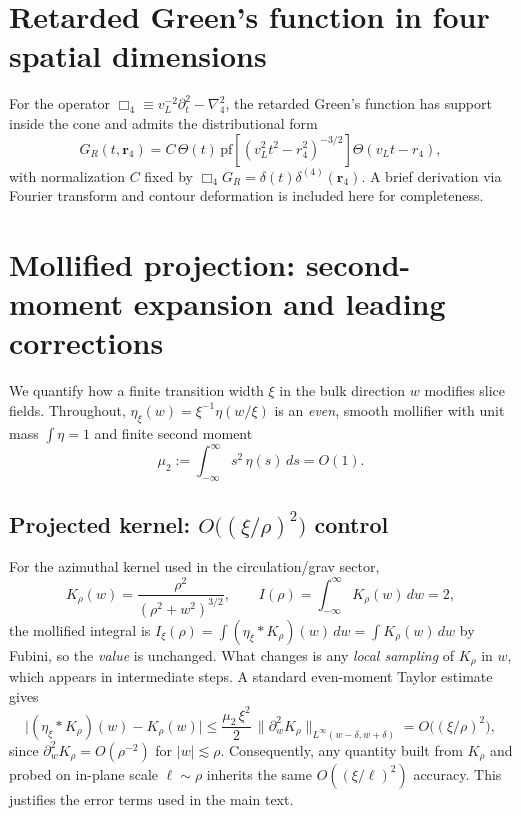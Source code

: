 \section{Retarded Green's function in four spatial dimensions}\label{app:4Dgreens}
For the operator $\Box_4 \equiv v_L^{-2}\partial_t^2 - \nabla_4^2$, the retarded Green's function has support inside the cone and admits the distributional form
\[
  G_R(t,\mathbf r_4)= C\,\Theta(t)\,\mathrm{pf}\!\left[(v_L^2 t^2 - r_4^2)^{-3/2}\right]\Theta(v_L t - r_4),
\]
with normalization $C$ fixed by $\Box_4 G_R = \delta(t)\delta^{(4)}(\mathbf r_4)$. A brief derivation via Fourier transform and contour deformation is included here for completeness.

\section{Mollified projection: second-moment expansion and leading corrections}
\label{app:mollified}

We quantify how a finite transition width $\xi$ in the bulk direction $w$ modifies slice fields. Throughout, $\eta_\xi(w)=\xi^{-1}\eta(w/\xi)$ is an \emph{even}, smooth mollifier with unit mass $\int\eta=1$ and finite second moment
\[
\mu_2:=\int_{-\infty}^{\infty} s^2\,\eta(s)\,ds=O(1).\tag{D.1}
\]

\subsection{Projected kernel: $O\big((\xi/\rho)^2\big)$ control}
For the azimuthal kernel used in the circulation/grav sector,
\[
K_\rho(w)=\frac{\rho^2}{(\rho^2+w^2)^{3/2}},\qquad I(\rho)=\int_{-\infty}^{\infty}K_\rho(w)\,dw=2,\tag{D.2}
\]
the mollified integral is $I_\xi(\rho)=\int (\eta_\xi*K_\rho)(w)\,dw= \int K_\rho(w)\,dw$ by Fubini, so the \emph{value} is unchanged. What changes is any \emph{local sampling} of $K_\rho$ in $w$, which appears in intermediate steps. A standard even-moment Taylor estimate gives
\[
\big|(\eta_\xi*K_\rho)(w)-K_\rho(w)\big|
\le \frac{\mu_2\,\xi^2}{2}\,\big\|\partial_w^2K_\rho\big\|_{L^\infty(w-\delta,w+\delta)}
=O\!\big((\xi/\rho)^2\big),\tag{D.3}
\]
since $\partial_w^2K_\rho=O(\rho^{-2})$ for $|w|\lesssim \rho$. Consequently, any quantity built from $K_\rho$ and probed on in-plane scale $\ell\sim\rho$ inherits the same $O((\xi/\ell)^2)$ accuracy. This justifies the error terms used in the main text.

